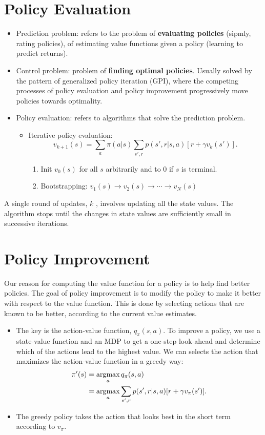 \section{Policy Evaluation}
\begin{itemize}
	\item Prediction problem: refers to the problem of \textbf{evaluating policies} (sipmly, rating policies), of estimating value functions given a policy (learning to predict returns).
	\item Control problem: problem of \textbf{finding optimal policies}. Usually solved by the pattern of generalized policy iteration (GPI), where the competing processes of policy evaluation and policy improvement progressively move policies towards optimality.
	\item Policy evaluation: refers to algorithms that solve the prediction problem.
		\begin{itemize}
			\item Iterative policy evaluation:
				$$v_{k+1}(s)=\sum_{a}\pi(a|s)\sum_{s',r}p(s',r|s,a)[r + \gamma v_k(s')].$$ 
				\begin{enumerate}
					\item Init $v_0(s)$ for all $s$ arbitrarily and to 0 if $s$ is terminal. 
					\item Bootstrapping: $v_1(s)\to v_2(s)\to\cdots\to v_N(s)$
				\end{enumerate}
		\end{itemize}
\end{itemize}

A single round of updates, $k$ , involves updating all the state values. The algorithm stops until 
the changes in state values are sufficiently small in successive iterations.

\section{Policy Improvement}
Our reason for computing the value function for a policy is to help find better policies. The goal of policy improvement is to modify the policy to make it better with respect to the value function. This is done by selecting actions that are known to be better, according to the current value estimates.

\begin{itemize}
	\item The key is the action-value function, $q_\pi(s,a)$. To improve a policy, we use a state-value function and an MDP to get a one-step look-ahead and determine which of the actions lead to the highest value. We can selects the action that maximizes the action-value function in a greedy way: 
		\begin{align*}
			\pi'(s) &= \operatorname*{\operatorname{argmax}}_a q_\pi(s,a)\\
			&= \operatorname*{\operatorname{argmax}}_a \sum_{s',r}p(s',r|s,a)[r + \gamma v_\pi(s')].
		\end{align*}
	\item The greedy policy takes the action that looks best in the short term according to $v_\pi$.
\end{itemize}


